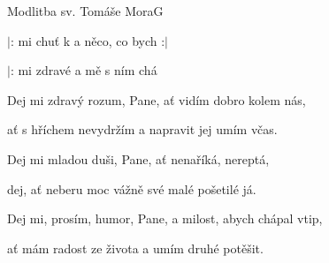 \setcounter{page}{107}
\begin{song}{Modlitba sv. Tomáše Mora}{G}{}

\begin{SBVerse}

$|$:  mi chuť k   a  něco, co bych :$|$

$|$:  mi zdravé   a  mě s ním chá

\end{SBVerse}

\begin{SBVerse}

Dej mi zdravý rozum, Pane, ať vidím dobro kolem nás,

ať s hříchem nevydržím a napravit jej umím včas.

\end{SBVerse}

\begin{SBVerse}

Dej mi mladou duši, Pane, ať nenaříká, nereptá,

dej, ať neberu moc vážně své malé pošetilé já.

\end{SBVerse}

\begin{SBVerse}

Dej mi, prosím, humor, Pane, a milost, abych chápal vtip,

ať mám radost ze života a umím druhé potěšit.

\end{SBVerse}

\end{song}
\pagebreak

